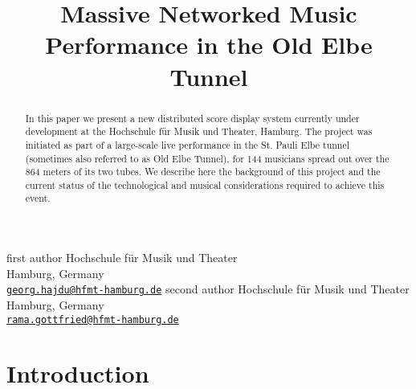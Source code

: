 

\def\papertitle{Massive Networked Music Performance in the Old Elbe Tunnel
}
\def\firstauthor{first author} %
\def\secondauthor{second author} %

\def\Hochschule{ Hochschule f\"ur Musik und Theater}

\title{\papertitle}
\twoauthors
   {\firstauthor} {	
      Hochschule f\"ur Musik und Theater\\
         Hamburg, Germany \\ %
   \small{\tt \href{mailto:georg.hajdu@hfmt-hamburg.de}{georg.hajdu@hfmt-hamburg.de}}}
    {\secondauthor} {
   Hochschule f\"ur Musik und Theater\\
   Hamburg, Germany \\ %
   \small{\tt \href{mailto:rama.gottfried@hfmt-hamburg.de}{rama.gottfried@hfmt-hamburg.de}}}





%

\capstartfalse
\maketitle
\capstarttrue
%
\begin{abstract}
In this paper we present a new distributed score display system currently under development at the Hochschule f\"ur Musik und Theater, Hamburg.
The project was initiated as part of a large-scale live performance in the St. Pauli Elbe tunnel (sometimes also referred to as Old Elbe Tunnel), for 144 musicians spread out over the 864 meters of its two tubes.
We describe here the background of this project and the current status of the technological and musical considerations required to achieve this event.

\end{abstract}

\section{Introduction}\label{sec:intro}

%
%
%

